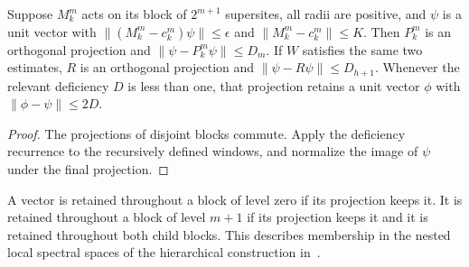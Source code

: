 \begin{lemma}
    \label{thm:hastings05_constructed_deficiency}
    \leanok
    Suppose $M_k^m$ acts on its block of $2^{m+1}$ supersites, all radii are
    positive, and $\psi$ is a unit vector with
    $\|(M_k^m-c_k^m)\psi\|\le\epsilon$ and $\|M_k^m-c_k^m\|\le K$.
    Then $P_k^m$ is an orthogonal projection and
    $\|\psi-P_k^m\psi\|\le D_m$. If $W$ satisfies the same two estimates,
    $R$ is an orthogonal projection and $\|\psi-R\psi\|\le D_{h+1}$.
    Whenever the relevant deficiency $D$ is less than one, that projection
    retains a unit vector $\phi$ with $\|\phi-\psi\|\le2D$.
\end{lemma}
\begin{proof}\leanok
    The projections of disjoint blocks commute. Apply the deficiency
    recurrence to the recursively defined windows, and normalize the image
    of $\psi$ under the final projection.
\end{proof}

\begin{definition}
    \label{def:hastings05_retained_tree}
    \leanok
    A vector is retained throughout a block of level zero if its projection
    keeps it. It is retained throughout a block of level $m+1$ if its
    projection keeps it and it is retained throughout both child blocks.
    This describes membership in the nested local spectral spaces of the
    hierarchical construction in~\cite[lines 668--704]{Hastings2006Solving}.
\end{definition}

